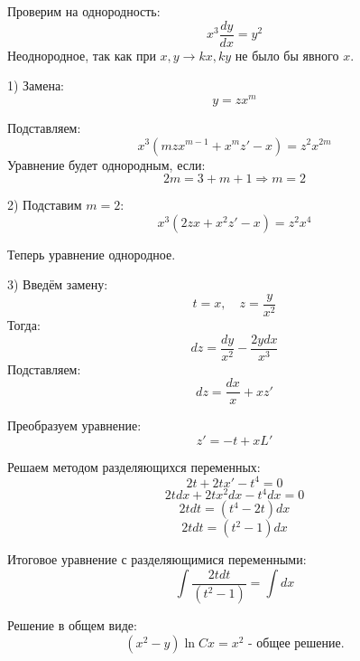 \begin{solution}
    Проверим на однородность:  
    $$ x^3 \frac{dy}{dx} = y^2 $$  
    Неоднородное, так как при $x, y \to kx, ky$ не было бы явного $x$.  

    1) Замена:  
    $$ y = z x^m $$  

    Подставляем:  
    $$ x^3 \left( m z x^{m-1} + x^m z' - x \right) = z^2 x^{2m} $$  
    Уравнение будет однородным, если:  
    $$ 2m = 3 + m + 1 \Rightarrow m = 2 $$  

    2) Подставим $m = 2$:  
    $$ x^3 \left( 2z x + x^2 z' - x \right) = z^2 x^4 $$  

    Теперь уравнение однородное.  

    3) Введём замену:  
    $$ t = x, \quad z = \frac{y}{x^2} $$  
    Тогда:  
    $$ dz = \frac{dy}{x^2} - \frac{2y dx}{x^3} $$  
    Подставляем:  
    $$ dz = \frac{dx}{x} + x z' $$  

    Преобразуем уравнение:  
    $$ z' = -t + x L' $$  

    Решаем методом разделяющихся переменных:  
    $$ 2t + 2t x' - t^4 = 0 $$  
    $$ 2t dx + 2t x^2 dx - t^4 dx = 0 $$  
    $$ 2t dt = (t^4 - 2t) dx $$  
    $$ 2t dt = (t^2 - 1) dx $$  

    Итоговое уравнение с разделяющимися переменными:  
    $$ \int \frac{2t dt}{(t^2 - 1)} = \int dx $$  

    Решение в общем виде:  
    $$ (x^2 - y) \ln C x = x^2 \text{ - общее решение.} $$  
\end{solution}

\pagebreak
